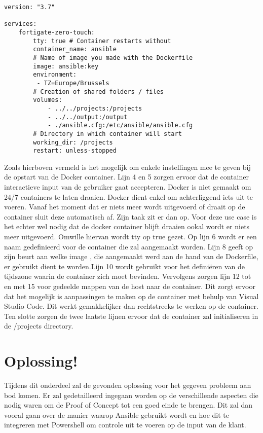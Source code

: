 \begin{lstlisting}
version: "3.7"

services:
    fortigate-zero-touch:
        tty: true # Container restarts without
        container_name: ansible
        # Name of image you made with the Dockerfile
        image: ansible:key
        environment:
         - TZ=Europe/Brussels 
        # Creation of shared folders / files     
        volumes:
            - ../../projects:/projects
            - ../../output:/output
            - ./ansible.cfg:/etc/ansible/ansible.cfg
        # Directory in which container will start
        working_dir: /projects
        restart: unless-stopped
\end{lstlisting}

Zoals hierboven vermeld is het mogelijk om enkele instellingen mee te geven bij de opstart van de Docker container. Lijn 4 en 5 zorgen ervoor dat de container interactieve input van de gebruiker gaat accepteren. Docker is niet gemaakt om 24/7 containers te laten draaien. Docker dient enkel om achterliggend iets uit te voeren. Vanaf het moment dat er niets meer wordt uitgevoerd of draait op de container sluit deze automatisch af. Zijn taak zit er dan op. Voor deze use case is het echter wel nodig dat de docker container blijft draaien ookal wordt er niets meer uitgevoerd. Omwille hiervan wordt tty op true gezet. Op lijn 6 wordt er een naam gedefinieerd voor de container die zal aangemaakt worden. Lijn 8 geeft op zijn beurt aan welke image , die aangemaakt werd aan de hand van de Dockerfile, er gebruikt dient te worden.Lijn 10 wordt gebruikt voor het definiëren van de tijdszone waarin de container zich moet bevinden. Vervolgens zorgen lijn 12 tot en met 15 voor gedeelde mappen van de host naar de container. Dit zorgt ervoor dat het mogelijk is aanpassingen te maken op de container met behulp van Visual Studio Code. Dit werkt gemakkelijker dan rechtstreeks te werken op de container. Ten slotte zorgen de twee laatste lijnen ervoor dat de container zal initialiseren in de /projects directory.


\section{Oplossing!}
Tijdens dit onderdeel zal de gevonden oplossing voor het gegeven probleem aan bod komen. Er zal gedetailleerd ingegaan worden op de verschillende aspecten die nodig waren om de Proof of Concept tot een goed einde te brengen. Dit zal dan vooral gaan over de manier waarop Ansible gebruikt wordt en hoe dit te integreren met Powershell om controle uit te voeren op de input van de klant. 

